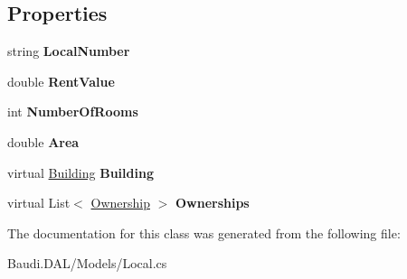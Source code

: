 \subsection*{Properties}
\begin{DoxyCompactItemize}
\item 
\hypertarget{class_baudi_1_1_d_a_l_1_1_models_1_1_local_ac21d00688a4d6b1971aac8e102d4fd3e}{}string {\bfseries Local\+Number}\label{class_baudi_1_1_d_a_l_1_1_models_1_1_local_ac21d00688a4d6b1971aac8e102d4fd3e}

\item 
\hypertarget{class_baudi_1_1_d_a_l_1_1_models_1_1_local_a2df08b829b84641cc2a372321d608132}{}double {\bfseries Rent\+Value}\label{class_baudi_1_1_d_a_l_1_1_models_1_1_local_a2df08b829b84641cc2a372321d608132}

\item 
\hypertarget{class_baudi_1_1_d_a_l_1_1_models_1_1_local_a29d525370c0ea698e32e36854edb0783}{}int {\bfseries Number\+Of\+Rooms}\label{class_baudi_1_1_d_a_l_1_1_models_1_1_local_a29d525370c0ea698e32e36854edb0783}

\item 
\hypertarget{class_baudi_1_1_d_a_l_1_1_models_1_1_local_a4123c017c30975b7258ee0c38c6949c6}{}double {\bfseries Area}\label{class_baudi_1_1_d_a_l_1_1_models_1_1_local_a4123c017c30975b7258ee0c38c6949c6}

\item 
\hypertarget{class_baudi_1_1_d_a_l_1_1_models_1_1_local_abce496c41a0afa73eadb80445ae3f1d6}{}virtual \hyperlink{class_baudi_1_1_d_a_l_1_1_models_1_1_building}{Building} {\bfseries Building}\label{class_baudi_1_1_d_a_l_1_1_models_1_1_local_abce496c41a0afa73eadb80445ae3f1d6}

\item 
\hypertarget{class_baudi_1_1_d_a_l_1_1_models_1_1_local_ab6897563203bafef597efc636d52603a}{}virtual List$<$ \hyperlink{class_baudi_1_1_d_a_l_1_1_models_1_1_ownership}{Ownership} $>$ {\bfseries Ownerships}\label{class_baudi_1_1_d_a_l_1_1_models_1_1_local_ab6897563203bafef597efc636d52603a}

\end{DoxyCompactItemize}


The documentation for this class was generated from the following file\+:\begin{DoxyCompactItemize}
\item 
Baudi.\+D\+A\+L/\+Models/Local.\+cs\end{DoxyCompactItemize}
